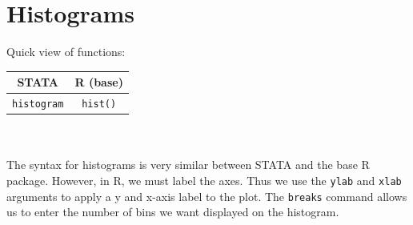 \documentclass[11pt,letterpaper,fleqn]{report}
\begin{document}
\section{Histograms}
Quick view of functions:\\
\begin{tabular}{cc}
STATA & R (base) \\
\hline
\texttt{histogram} & \texttt{hist()}
\end{tabular}\\
\\
The syntax for histograms is very similar between STATA and the base R package. However, in R, we must label the axes. Thus we use the \texttt{ylab} and \texttt{xlab} arguments to apply a y and x-axis label to the plot. The \texttt{breaks} command allows us to enter the number of bins we want displayed on the histogram.
\end{document}
